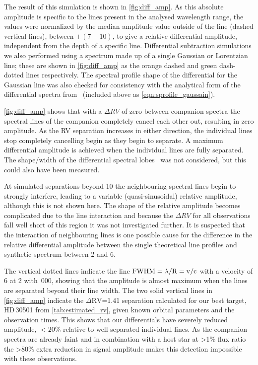 The result of this simulation is shown in \cref{fig:diff_amp}.
As this absolute amplitude is specific to the lines present in the analysed wavelength range, the values were normalized by the median amplitude value outside of the line {\fwhm} (dashed vertical lines), between \(\pm(7-10)\)\kmps{}, to give a relative differential amplitude, independent from the depth of a specific line.
Differential subtraction simulations we also performed using a spectrum made up of a single Gaussian or Lorentzian line; these are shown in \cref{fig:diff_amp} as the orange dashed and green dash-dotted lines respectively.
The spectral profile shape of the differential for the Gaussian line was also checked for consistency with the analytical form of the differential spectra from~\citet[][Equation~A.1]{ferluga_separating_1997} (included above as \cref{eqn:sprofile_gaussain}).

\cref{fig:diff_amp} shows that with a \(\Delta {RV}\) of zero between companion spectra the spectral lines of the companion completely cancel each other out, resulting in zero amplitude.
As the {RV} separation increases in either direction, the individual lines stop completely cancelling begin as they begin to separate.
A maximum differential amplitude is achieved when the individual lines are fully separated.
The shape/width of the differential spectral lobes~\citet[e.g.][eqn.~A.1]{ferluga_separating_1997} was not considered, but this could also have been measured.

At simulated separations beyond 10\kmps{} the neighbouring spectral lines begin to strongly interfere, leading to a variable (quasi-sinusoidal) relative amplitude, although this is not shown here.
The shape of the relative amplitude becomes complicated due to the line interaction and because the \(\Delta {RV}\) for all observations fall well short of this region it was not investigated further.
It is suspected that the interaction of neighbouring lines is one possible cause for the difference in the relative differential amplitude between the single theoretical line profiles and synthetic spectrum between 2 and 6\kmps{}.

The vertical dotted lines indicate the line \(\rm {\textrm{FWHM}} = \lambda /\textrm{R}=v /c\) with a velocity of 6\kmps{} at 2\um{} with \,000, showing that the amplitude is almost maximum when the lines are separated beyond their line width.
The two solid vertical lines in \cref{fig:diff_amp} indicate the \(\Delta \textrm{RV}\)=1.41\kmps{} separation calculated for our best target, {HD\,30501} from \cref{tab:estimated_rv}, given known orbital parameters and the observation times.
This shows that our differentials have severely reduced amplitude, \(<20\%\) relative to well separated individual lines.
As the companion spectra are already faint and in combination with a host star at >1\% flux ratio the >80\% extra reduction in signal amplitude makes this detection impossible with these observations.

